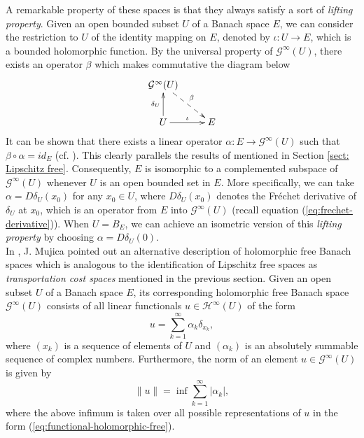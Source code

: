 \documentclass[12pt,leqno]{amsart}
\numberwithin{equation}{section} %
\theoremstyle{definition}
\numberwithin{equation}{section}
\begin{document}
A remarkable property of these spaces is that they always satisfy a sort of \textit{lifting property}. Given an open bounded subset $U$ of a Banach space $E$, we can consider the restriction to $U$ of the identity mapping on $E$, denoted by $\iota:U\to E$, which is a bounded holomorphic function. By the universal property of $\mathcal{G}^\infty(U)$, there exists an operator $\beta$ which makes commutative the diagram below
$$
\xymatrix{\mathcal{G}^\infty(U)\ar@{-->}[rd]^{\beta}\\
     U\ar[r]^{\iota}\ar^{\delta_U}[u]& E }
$$
It can be shown that there exists a linear operator $\alpha:E\to \mathcal{G}^\infty(U)$ such that $\beta\circ\alpha=id_E$  (cf. \cite[Proposition 2.3]{Mujica91}). This clearly parallels the results of \cite{GK} mentioned in Section \ref{sect: Lipschitz free}. Consequently, $E$ is isomorphic to a complemented subspace of $\mathcal{G}^\infty(U)$ whenever $U$ is an open bounded set in $E$. More specifically, we can take $\alpha=D\delta_U(x_0)$ for any $x_0\in U$, where $D\delta_U(x_0)$ denotes the Fr\'{e}chet derivative of $\delta_U$ at $x_0$, which is an operator from $E$ into $\mathcal{G}^\infty(U)$ (recall equation (\ref{eq:frechet-derivative})). When $U=B_E$, we can achieve an isometric version of this \textit{lifting property} by choosing $\alpha=D\delta_U(0)$. \\



In \cite[Corollary 4.12]{Mujica91}, J. Mujica pointed out an alternative description of holomorphic free Banach spaces which is analogous to the identification of Lipschitz free spaces as  \textit{transportation cost spaces} mentioned in the previous section. Given an open subset $U$ of a Banach space $E$, its corresponding holomorphic free Banach space $\mathcal{G}^\infty(U)$ consists of all linear functionals $u\in\mathcal{H}^\infty(U)$ of the form
\begin{equation}\label{eq:functional-holomorphic-free}
 u=\sum_{k=1}^\infty \alpha_k\delta_{x_k},   
\end{equation}
where $(x_k)$ is a sequence of elements of $U$ and $(\alpha_k)$ is an absolutely summable sequence of complex numbers. Furthermore, the norm of an element $u\in \mathcal{G}^\infty(U)$ is given by
$$
\|u\|=\inf \sum_{k=1}^\infty |\alpha_k|,
$$
where the above infimum is taken over all possible representations of $u$ in the form (\ref{eq:functional-holomorphic-free}).
\\
\end{document}
